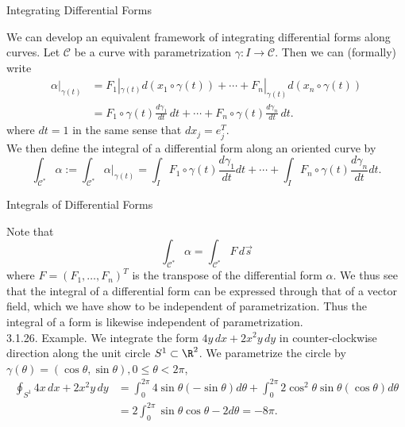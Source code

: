 \documentclass[smaller,hyperref={CJKbookmarks=true}]{beamer}
\begin{document}
\begin{frame}[c]{Integrating Dif{}ferential Forms}
\begin{spacing}{1}
We can develop an equivalent framework of integrating dif{}ferential forms
along curves. Let $\mathcal{C}$ be a curve with parametrization $\gamma:I\to\mathcal{C}$. Then we can (formally) write
\begin{equation*}
  \begin{split}
     \alpha|_{\gamma(t)} &=F_1|_{\gamma(t)}d(x_1\circ\gamma(t))+\cdots
     +F_n|_{\gamma(t)}d(x_n\circ\gamma(t)) \\
       &=F_1\circ\gamma(t)\frac{d\gamma_1}{dt}\,dt+\cdots
       +F_n\circ\gamma(t)\frac{d\gamma_n}{dt}\,dt.
  \end{split}
\end{equation*}
where $dt=1$ in the same sense that $dx_j=e_j^T$.\\[5pt]
We then define the integral of a dif{}ferential form along an oriented curve by
\begin{equation}\label{3.1.12}
  \int_{\mathcal{C}^*}\alpha:=\int_{\mathcal{C}^*}
  \alpha|_{\gamma(t)}=\int_I F_1\circ\gamma(t)\frac{d\gamma_1}{dt}dt+\cdots+
  \int_I F_n\circ\gamma(t)\frac{d\gamma_n}{dt}dt.
\end{equation}
\end{spacing}
\end{frame}
\begin{frame}[t]{Integrals of Dif{}ferential Forms}
\begin{spacing}{1}
Note that
\[\int_{\mathcal{C}^*}\alpha=\int_{\mathcal{C}^*}F\,d\vec{s}\]
where $F=(F_1,\ldots,F_n)^T$ is the transpose of the dif{}ferential form $\alpha$. We
thus see that the integral of a dif{}ferential form can be expressed through
that of a vector field, which we have show to be independent of
parametrization. Thus the integral of a form is likewise independent of
parametrization.\\[5pt]
\alert{3.1.26. Example.} We integrate the form $4y\,dx+2x^2y\,dy$ in counter-clockwise direction along the unit circle $S^1\subset\R^2$. We parametrize the circle by $\gamma(\theta)=(\cos\theta,\sin\theta),0\leq
\theta<2\pi$,
\begin{equation*}
  \begin{split}
     \oint_{S^1}4x\,dx+2x^2y\,dy &=\int_{0}^{2\pi}4\sin\theta(-\sin\theta)d\theta
     +\int_{0}^{2\pi}2\cos^2\theta\sin\theta(\cos\theta)d\theta \\
       &=2\int_{0}^{2\pi}\sin\theta\cos\theta-2d\theta=-8\pi.
  \end{split}
\end{equation*}
\end{spacing}
\end{frame}
\end{document}
